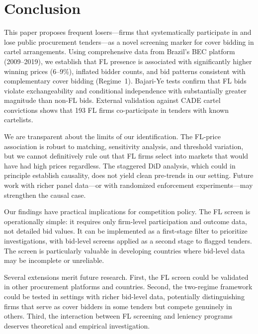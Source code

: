 \documentclass[12pt]{elsarticle}
\begin{document}
\section{Conclusion}
\label{sec:conclusion}

This paper proposes frequent losers---firms that systematically participate in and lose public procurement tenders---as a novel screening marker for cover bidding in cartel arrangements. Using comprehensive data from Brazil's BEC platform (2009--2019), we establish that FL presence is associated with significantly higher winning prices (6--9\%), inflated bidder counts, and bid patterns consistent with complementary cover bidding (Regime~1). Bajari-Ye tests confirm that FL bids violate exchangeability and conditional independence with substantially greater magnitude than non-FL bids. External validation against CADE cartel convictions shows that 193 FL firms co-participate in tenders with known cartelists.

We are transparent about the limits of our identification. The FL-price association is robust to matching, sensitivity analysis, and threshold variation, but we cannot definitively rule out that FL firms select into markets that would have had high prices regardless. The staggered DiD analysis, which could in principle establish causality, does not yield clean pre-trends in our setting. Future work with richer panel data---or with randomized enforcement experiments---may strengthen the causal case.

Our findings have practical implications for competition policy. The FL screen is operationally simple: it requires only firm-level participation and outcome data, not detailed bid values. It can be implemented as a first-stage filter to prioritize investigations, with bid-level screens applied as a second stage to flagged tenders. The screen is particularly valuable in developing countries where bid-level data may be incomplete or unreliable.

Several extensions merit future research. First, the FL screen could be validated in other procurement platforms and countries. Second, the two-regime framework could be tested in settings with richer bid-level data, potentially distinguishing firms that serve as cover bidders in some tenders but compete genuinely in others. Third, the interaction between FL screening and leniency programs deserves theoretical and empirical investigation.

\clearpage


\clearpage
\end{document}

